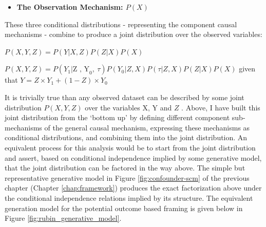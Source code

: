 \documentclass[../main.tex]{subfiles}
\begin{document}
\begin{itemize}
\vspace{\baselineskip}
	\item \textbf{The Observation Mechanism:  \( P \left( X \right)  \)  }
\end{itemize}\par


\vspace{\baselineskip}
These three conditional distributions - representing the component causal mechanisms - combine to produce a joint distribution over the observed variables:\par


\vspace{\baselineskip}
\begin{adjustwidth}{0.5in}{0.0in}
 \( P \left( X, Y, Z \right)  = P \left( Y \vert X, Z \right) P \left( Z  \vert  X \right) P \left( X \right)  \) \par

\end{adjustwidth}

\begin{adjustwidth}{0.5in}{0.0in}
 \( P \left( X, Y, Z \right)  = P \left( Y_{1}  \vert  \text{Z , Y}_{0},~ \tau \right) P \left( Y_{0} \vert Z, X \right) P \left(  \tau \vert Z, X \right) P \left( Z  \vert  X \right) P \left( X \right)  \) given that  \(  Y=Z \times Y_{1}+ \left( 1-Z \right)  \times Y_{0} \) \par

\end{adjustwidth}


\vspace{\baselineskip}
It is trivially true than any observed dataset can be described by some joint distribution  \( P \left( X, Y, Z \right)  \)  over the variables  \( \text{X, Y} \) and  \( Z \) . Above, I have built this joint distribution from the ‘bottom up’ by defining different component sub-mechanisms of the general causal mechanism, expressing these mechanisms as conditional distributions, and combining them into the joint distribution. An equivalent process for this analysis would be to start from the joint distribution and assert, based on conditional independence implied by some generative model, that the joint distribution can be factored in the way above. The simple but representative generative model in Figure \ref{fig:confounder-scm} of the previous chapter (Chapter \ref{chap:framework}) produces the exact factorization above under the conditional independence relations implied by its structure. The equivalent generation model for the potential outcome based framing is given below in Figure \ref{fig:rubin_generative_model}.\par
\end{document}
